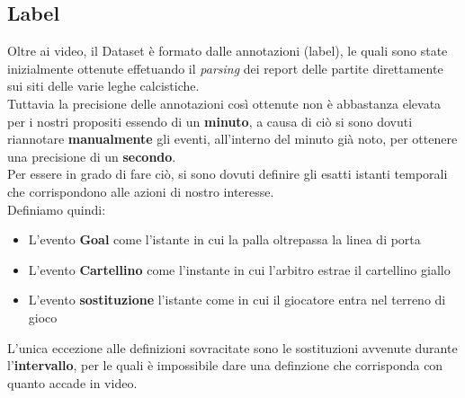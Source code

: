 \subsection{Label}
Oltre ai video, il Dataset è formato dalle annotazioni (label), le quali sono state inizialmente ottenute effetuando il \textit{parsing} dei report delle partite direttamente sui siti delle varie leghe calcistiche.
\\Tuttavia la precisione delle annotazioni così ottenute non è abbastanza elevata per i nostri propositi essendo di un \textbf{minuto}, a causa di ciò si sono dovuti riannotare \textbf{manualmente} gli eventi, all'interno del minuto già noto, per ottenere una precisione di un \textbf{secondo}.
\\Per essere in grado di fare ciò, si sono dovuti definire gli esatti istanti temporali che corrispondono alle azioni di nostro interesse.
\\Definiamo quindi:
\begin{itemize}
\item L'evento \textbf{Goal} come l'istante in cui la palla oltrepassa la linea di porta
\item L'evento \textbf{Cartellino} come l'instante in cui l'arbitro estrae il cartellino giallo
\item L'evento \textbf{sostituzione} l'istante come in cui il giocatore entra nel terreno di gioco
\end{itemize}
L'unica eccezione alle definizioni sovracitate sono le sostituzioni avvenute durante l'\textbf{intervallo}, per le quali è impossibile dare una definzione che corrisponda con quanto accade in video.
